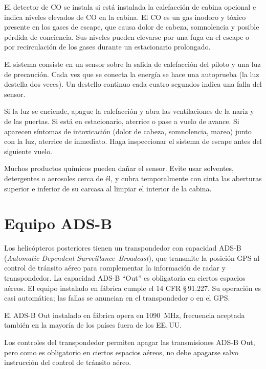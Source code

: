 El detector de CO se instala si está instalada la calefacción de cabina opcional e indica niveles elevados de CO en la cabina. El CO es un gas inodoro y tóxico presente en los gases de escape, que causa dolor de cabeza, somnolencia y posible pérdida de conciencia. Sus niveles pueden elevarse por una fuga en el escape o por recirculación de los gases durante un estacionario prolongado.

El sistema consiste en un sensor sobre la salida de calefacción del piloto y una luz de precaución. Cada vez que se conecta la energía se hace una autoprueba (la luz destella dos veces). Un destello continuo cada cuatro segundos indica una falla del sensor.

Si la luz se enciende, apague la calefacción y abra las ventilaciones de la nariz y de las puertas. Si está en estacionario, aterrice o pase a vuelo de avance. Si aparecen síntomas de intoxicación (dolor de cabeza, somnolencia, mareo) junto con la luz, aterrice de inmediato. Haga inspeccionar el sistema de escape antes del siguiente vuelo.

Muchos productos químicos pueden dañar el sensor. Evite usar solventes, detergentes o aerosoles cerca de él, y cubra temporalmente con cinta las aberturas superior e inferior de su carcasa al limpiar el interior de la cabina.

\section{Equipo ADS-B}

Los helicópteros posteriores tienen un transpondedor con capacidad ADS-B (\emph{Automatic Dependent Surveillance--Broadcast}), que transmite la posición GPS al control de tránsito aéreo para complementar la información de radar y transpondedor. La capacidad ADS-B ``Out'' es obligatoria en ciertos espacios aéreos. El equipo instalado en fábrica cumple el 14 CFR \S\,91.227. Su operación es casi automática; las fallas se anuncian en el transpondedor o en el GPS.

\begin{nota}
El ADS-B Out instalado en fábrica opera en 1090~MHz, frecuencia aceptada también en la mayoría de los países fuera de los EE.\,UU.
\end{nota}

\begin{nota}
Los controles del transpondedor permiten apagar las transmisiones ADS-B Out, pero como es obligatorio en ciertos espacios aéreos, no debe apagarse salvo instrucción del control de tránsito aéreo.
\end{nota}


